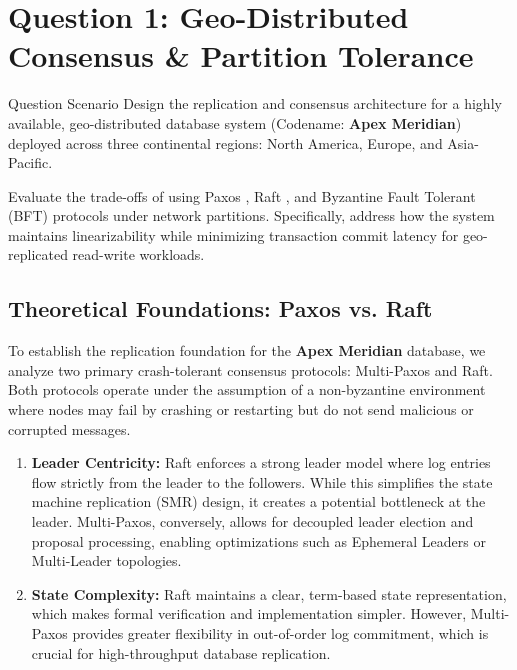 \section{Question 1: Geo-Distributed Consensus \& Partition Tolerance}
\label{sec:question1}

\begin{questionbox}{Question Scenario}
  Design the replication and consensus architecture for a highly available, geo-distributed database system (Codename: \textbf{Apex Meridian}) deployed across three continental regions: North America, Europe, and Asia-Pacific. 
  
  Evaluate the trade-offs of using Paxos \cite{lamport1998part}, Raft \cite{ongaro2014search}, and Byzantine Fault Tolerant (BFT) protocols under network partitions. Specifically, address how the system maintains linearizability while minimizing transaction commit latency for geo-replicated read-write workloads.
\end{questionbox}

\subsection{Theoretical Foundations: Paxos vs. Raft}

To establish the replication foundation for the \textbf{Apex Meridian} database, we analyze two primary crash-tolerant consensus protocols: Multi-Paxos and Raft. Both protocols operate under the assumption of a non-byzantine environment where nodes may fail by crashing or restarting but do not send malicious or corrupted messages.

\begin{enumerate}
  \item \textbf{Leader Centricity:} Raft enforces a strong leader model where log entries flow strictly from the leader to the followers. While this simplifies the state machine replication (SMR) design, it creates a potential bottleneck at the leader. Multi-Paxos, conversely, allows for decoupled leader election and proposal processing, enabling optimizations such as Ephemeral Leaders or Multi-Leader topologies.
  \item \textbf{State Complexity:} Raft maintains a clear, term-based state representation, which makes formal verification and implementation simpler. However, Multi-Paxos provides greater flexibility in out-of-order log commitment, which is crucial for high-throughput database replication.
\end{enumerate}

